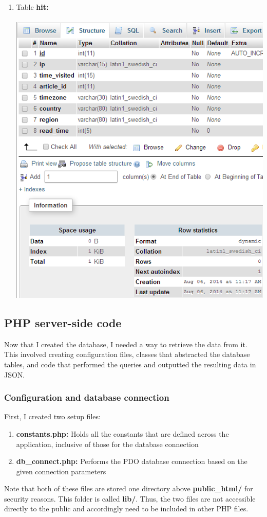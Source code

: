 \documentclass[12pt]{article}
\begin{document}
\begin{enumerate}
\vfill

\item{Table \textbf{hit:}}\\ \\
\includegraphics[scale=0.8]{img/hit_table}
\end{enumerate} 

\newpage

\subsection{PHP server-side code}
Now that I created the database, I needed a way to retrieve the data from it. This involved creating configuration files, classes that abstracted the database tables, and code that performed the queries and outputted the resulting data in JSON.
\subsubsection{Configuration and database connection}
First, I created two setup files:
\begin{enumerate}
\item{\textbf{constants.php:}} Holds all the constants that are defined across the application, inclusive of those for the database connection
\item{\textbf{db\_connect.php:}} Performs the PDO database connection based on the given connection parameters
\end{enumerate}
Note that both of these files are stored one directory above \textbf{public\_html/} for security reasons. This folder is called \textbf{lib/}. Thus, the two files are not accessible directly to the public and accordingly need to be included in other PHP files.
\end{document}
